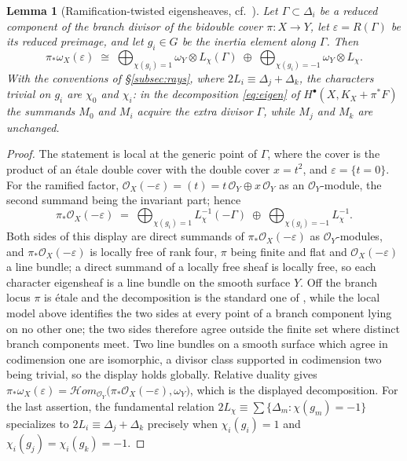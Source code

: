 \documentclass[10pt,a4paper]{amsart}
\newtheorem{lemma}[theorem]{Lemma}
\newcommand{\OO}{\mathcal{O}}
\begin{document}
\begin{lemma}[Ramification-twisted eigensheaves, cf.\ \cite{Par91}]\label{lem:ramtwist}
Let $\Gamma\subset\Delta_i$ be a reduced component of the branch divisor of the bidouble cover $\pi:X\to Y$, let $\varepsilon=R(\Gamma)$ be its reduced preimage, and let $g_i\in G$ be the inertia element along $\Gamma$. Then
\[
\pi_*\omega_X(\varepsilon)\;\cong\;
\bigoplus_{\chi(g_i)=1}\omega_Y\otimes L_\chi(\Gamma)
\;\oplus\;
\bigoplus_{\chi(g_i)=-1}\omega_Y\otimes L_\chi .
\]
With the conventions of \S\ref{subsec:rays}, where $2L_i\equiv\Delta_j+\Delta_k$, the characters trivial on $g_i$ are $\chi_0$ and $\chi_i$: in the decomposition \eqref{eq:eigen} of $H^\bullet(X,K_X+\pi^*F)$ the summands $M_0$ and $M_i$ acquire the extra divisor $\Gamma$, while $M_j$ and $M_k$ are unchanged.
\end{lemma}

\begin{proof}
The statement is local at the generic point of $\Gamma$, where the cover is the product of an \'etale double cover with the double cover $x=t^2$, and $\varepsilon=\{t=0\}$. For the ramified factor, $\OO_X(-\varepsilon)=(t)=t\,\OO_Y\oplus x\,\OO_Y$ as an $\OO_Y$-module, the second summand being the invariant part; hence
\[
\pi_*\OO_X(-\varepsilon)\;=\;\bigoplus_{\chi(g_i)=1}L_\chi^{-1}(-\Gamma)\;\oplus\;\bigoplus_{\chi(g_i)=-1}L_\chi^{-1} .
\]
Both sides of this display are direct summands of $\pi_*\OO_X(-\varepsilon)$ as $\OO_Y$-modules, and $\pi_*\OO_X(-\varepsilon)$ is locally free of rank four, $\pi$ being finite and flat and $\OO_X(-\varepsilon)$ a line bundle; a direct summand of a locally free sheaf is locally free, so each character eigensheaf is a line bundle on the smooth surface $Y$. Off the branch locus $\pi$ is \'etale and the decomposition is the standard one of \cite{Par91}, while the local model above identifies the two sides at every point of a branch component lying on no other one; the two sides therefore agree outside the finite set where distinct branch components meet. Two line bundles on a smooth surface which agree in codimension one are isomorphic, a divisor class supported in codimension two being trivial, so the display holds globally. Relative duality gives $\pi_*\omega_X(\varepsilon)=\mathcal{H}om_{\OO_Y}\bigl(\pi_*\OO_X(-\varepsilon),\omega_Y\bigr)$, which is the displayed decomposition. For the last assertion, the fundamental relation $2L_\chi\equiv\sum\{\Delta_m:\chi(g_m)=-1\}$ specializes to $2L_i\equiv\Delta_j+\Delta_k$ precisely when $\chi_i(g_i)=1$ and $\chi_i(g_j)=\chi_i(g_k)=-1$.
\end{proof}
\end{document}
